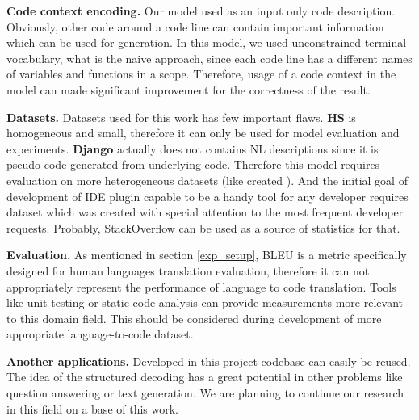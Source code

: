 \textbf{Code context encoding.} Our model used as an input only code description. Obviously, other code around a code line can contain important information which can be used for generation. In this model, we used unconstrained terminal vocabulary, what is the naive approach, since each code line has a different names of variables and functions in a scope. Therefore, usage of a code context in the model can made significant improvement for the correctness of the result.

\textbf{Datasets.} Datasets used for this work has few important flaws. \textbf{HS} is homogeneous and small, therefore it can only be used for model evaluation and experiments. \textbf{Django} actually does not contains NL descriptions since it is pseudo-code generated from underlying code. Therefore this model requires evaluation on more heterogeneous datasets (like created \cite{Barone2017}). And the initial goal of development of IDE plugin capable to be a handy tool for any developer requires dataset which was created with special attention to the most frequent developer requests. Probably, StackOverflow can be used as a source of statistics for that.

\textbf{Evaluation.} As mentioned in section \ref{exp_setup}, BLEU is a metric specifically designed for human languages translation evaluation, therefore it can not appropriately represent the performance of language to code translation. Tools like unit testing or static code analysis can provide measurements more relevant to this domain field. This should be considered during development of more appropriate language-to-code dataset.

\textbf{Another applications.} Developed in this project codebase can easily be reused. The idea of the structured decoding has a great potential in other problems like question answering or text generation. We are planning to continue our research in this field on a base of this work.

